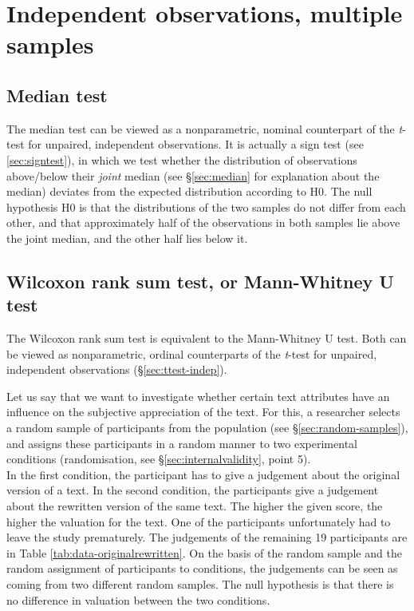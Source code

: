 \documentclass[
]{book}
\begin{document}
\hypertarget{independent-observations-multiple-samples}{%
\section{Independent observations, multiple samples}\label{independent-observations-multiple-samples}}

\hypertarget{median-test}{%
\subsection{Median test}\label{median-test}}

The median test can be viewed as a nonparametric, nominal
counterpart
of the \emph{t}-test for unpaired, independent observations. It is actually
a sign test (see \ref{sec:signtest}), in which we test whether the
distribution of observations above/below their \emph{joint} median
(see §\ref{sec:median} for explanation about the median) deviates from
the expected distribution according to H0.
The null hypothesis H0 is that the distributions of the two samples
do not differ from each other, and that approximately half of the observations
in both samples lie above the joint median, and the other half lies below
it.

\hypertarget{sec:wilcoxon-rank-sum}{%
\subsection{Wilcoxon rank sum test, or Mann-Whitney U test}\label{sec:wilcoxon-rank-sum}}

The Wilcoxon rank sum test is equivalent to the Mann-Whitney U test.
Both can be viewed as nonparametric, ordinal counterparts
of the \emph{t}-test for unpaired, independent observations
(§\ref{sec:ttest-indep}).

Let us say that we want to investigate whether certain text attributes
have an influence on the subjective appreciation of the text. For this,
a researcher selects a random sample of participants
from the population (see
§\ref{sec:random-samples}), and assigns these participants in a random
manner to two experimental conditions (randomisation, see
§\ref{sec:internalvalidity}, point 5).\\
In the first condition, the participant has to give a judgement about
the original version of a text. In the second condition, the participants
give a judgement about the rewritten version of the same text.
The higher the given score, the higher the valuation for the text.
One of the participants unfortunately had to leave the study
prematurely. The judgements of the remaining 19 participants
are in Table \ref{tab:data-originalrewritten}. On the basis of the random
sample and the random assignment of participants to conditions,
the judgements can be seen as coming from two different
random samples. The null hypothesis is that there is no difference
in valuation between the two conditions.
\end{document}
